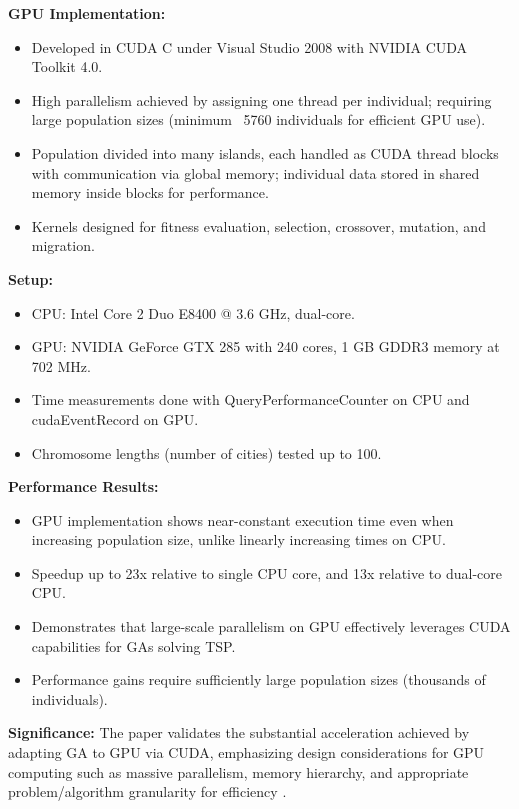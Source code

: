 \documentclass{article}
\begin{document}
\item \textbf{GPU Implementation:}
\begin{itemize}
    \item Developed in CUDA C under Visual Studio 2008 with NVIDIA CUDA Toolkit 4.0.
    \item High parallelism achieved by assigning one thread per individual; requiring large population sizes (minimum ~5760 individuals for efficient GPU use).
    \item Population divided into many islands, each handled as CUDA thread blocks with communication via global memory; individual data stored in shared memory inside blocks for performance.
    \item Kernels designed for fitness evaluation, selection, crossover, mutation, and migration.
\end{itemize}

\item \textbf{Setup:}
\begin{itemize}
    \item CPU: Intel Core 2 Duo E8400 @ 3.6 GHz, dual-core.
    \item GPU: NVIDIA GeForce GTX 285 with 240 cores, 1 GB GDDR3 memory at 702 MHz.
    \item Time measurements done with QueryPerformanceCounter on CPU and cudaEventRecord on GPU.
    \item Chromosome lengths (number of cities) tested up to 100.
\end{itemize}

\item \textbf{Performance Results:}
\begin{itemize}
    \item GPU implementation shows near-constant execution time even when increasing population size, unlike linearly increasing times on CPU.
    \item Speedup up to 23x relative to single CPU core, and 13x relative to dual-core CPU.
    \item Demonstrates that large-scale parallelism on GPU effectively leverages CUDA capabilities for GAs solving TSP.
    \item Performance gains require sufficiently large population sizes (thousands of individuals).
\end{itemize}

\item \textbf{Significance:} The paper validates the substantial acceleration achieved by adapting GA to GPU via CUDA, emphasizing design considerations for GPU computing such as massive parallelism, memory hierarchy, and appropriate problem/algorithm granularity for efficiency \cite{plichta2014cuda}.



\end{document}
